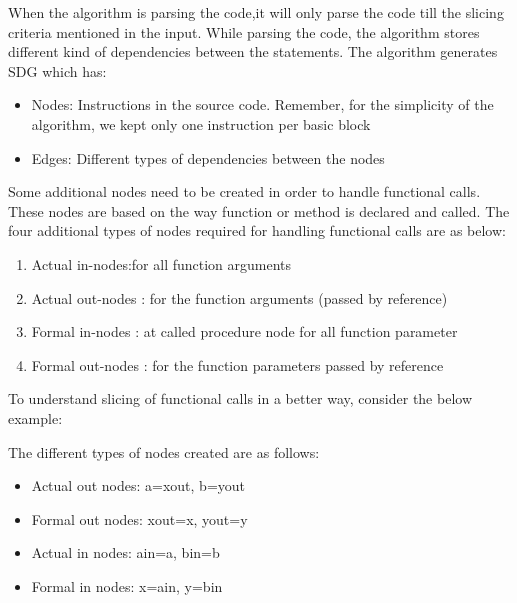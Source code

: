 \documentclass[conference]{IEEEtran}
\begin{document}
When the algorithm is parsing the code,it will only parse the code till the slicing criteria mentioned in the input. While parsing the code, the algorithm stores different kind of dependencies between the statements. The algorithm generates SDG which has:
\begin{itemize}
    \item Nodes: Instructions in the source code. Remember, for the simplicity of the algorithm, we kept only one instruction per basic block
    \item Edges: Different types of dependencies between the nodes
\end{itemize}

Some additional nodes need to be created in order to handle functional calls. These nodes are based on the way function or method is declared and called. The four additional types of nodes required for handling functional calls are as below:
\begin{enumerate}
    \item Actual in-nodes:for all function arguments
    \item Actual out-nodes : for the function arguments (passed by reference)
    \item Formal in-nodes : at called procedure node for all function parameter
\item  Formal out-nodes : for the function parameters passed by reference
\end{enumerate}

To understand slicing of functional calls in a better way, consider the below example:

The different types of nodes created are as follows:
\begin{itemize}
    \item Actual out nodes: a=x\textunderscore out, b=y\textunderscore out
    \item Formal out nodes: x\textunderscore out=x, y\textunderscore out=y
    \item Actual in nodes: a\textunderscore in=a, b\textunderscore in=b
    \item Formal in nodes: x=a\textunderscore in, y=b\textunderscore in
\end{itemize}
\end{document}

